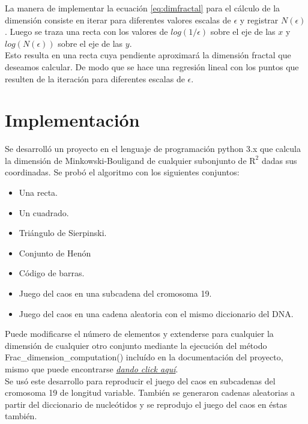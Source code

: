 \documentclass[letterpaper,12pt,oneside]{book}
\begin{document}
La manera de implementar la ecuación \ref{eq:dimfractal} para el cálculo de la dimensión consiste en iterar para diferentes valores escalas de $\epsilon$ y registrar $N(\epsilon)$. Luego se traza una recta con los valores de $log(1/\epsilon)$ sobre el eje de las $x$ y $log (N(\epsilon))$ sobre el eje de las $y$.
\\

Esto resulta en una recta cuya pendiente aproximará la dimensión fractal que deseamos calcular. De modo que se hace una regresión lineal con los puntos que resulten de la iteración para diferentes escalas de $\epsilon$.



\chapter{Implementación}

Se desarrolló un proyecto en el lenguaje de programación python 3.x que calcula la dimensión de Minkowski-Bouligand de cualquier subonjunto de $\mathrm{R^{2}}$ dadas sus coordinadas. Se probó el algoritmo con los siguientes conjuntos:

\begin{itemize}
    \item Una recta.
    \item Un cuadrado.
    \item Triángulo de Sierpinski.
    \item Conjunto de Henón
    \item Código de barras.
    \item Juego del caos en una subcadena del cromosoma 19.
    \item Juego del caos en una cadena aleatoria con el mismo diccionario del DNA.
\end{itemize}

Puede modificarse el número de elementos y extenderse para cualquier la dimensión de cualquier otro conjunto mediante la ejecución del método Frac_dimension_computation() incluído en la documentación del proyecto, mismo que puede encontrarse \href{https://github.com/RobertoBastida/ChaosGame_DNA}{\emph{dando click aquí}}.
\\

Se usó este desarrollo para reproducir el juego del caos en subcadenas del cromosoma 19 de longitud variable. También se generaron cadenas aleatorias a partir del diccionario de nucleótidos y se reprodujo el juego del caos en éstas también.
\end{document}
